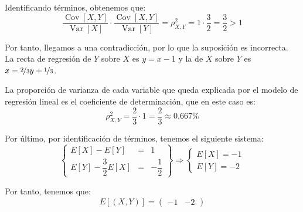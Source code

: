 \documentclass[12pt]{article}
\DeclareMathOperator{\Var}{Var}
\DeclareMathOperator{\Cov}{Cov}
\begin{document}
\begin{ejercicio}
\begin{enumerate}
            Identificando términos, obtenemos que:
            \begin{equation*}
                \dfrac{\Cov[X,Y]}{\Var[X]}\cdot \dfrac{\Cov[X,Y]}{\Var[Y]} = \rho_{X,Y}^2 = 1\cdot \dfrac{3}{2} = \dfrac{3}{2}>1
            \end{equation*}

            Por tanto, llegamos a una contradicción, por lo que la suposición es incorrecta. La recta de regresión de $Y$ sobre $X$ es $y=x-1$ y la de $X$ sobre $Y$ es $x=\nicefrac{2}{3}y+\nicefrac{1}{3}$.

            La proporción de varianza de cada variable que queda explicada por el modelo de regresión lineal es el coeficiente de determinación, que en este caso es:
            \begin{equation*}
                \rho_{X,Y}^2 = \dfrac{2}{3}\cdot 1=\dfrac{2}{3}\approx 0.667\%
            \end{equation*}

            Por último, por identificación de términos, tenemos el siguiente sistema:
            \begin{equation*}
                \left\{\begin{array}{rcl}
                    E[X]-E[Y]&=&1 \\
                    E[Y]-\dfrac{3}{2}E[X]&=&-\dfrac{1}{2}
                \end{array}\right\}
                \Longrightarrow
                \begin{cases}
                    E[X]=-1 \\
                    E[Y]=-2
                \end{cases}
            \end{equation*}

            Por tanto, tenemos que:
            \begin{equation*}
                E[(X,Y)] = \begin{pmatrix}
                    -1 & -2
                \end{pmatrix}
            \end{equation*}
        \end{enumerate}
    \end{ejercicio}
\end{document}

